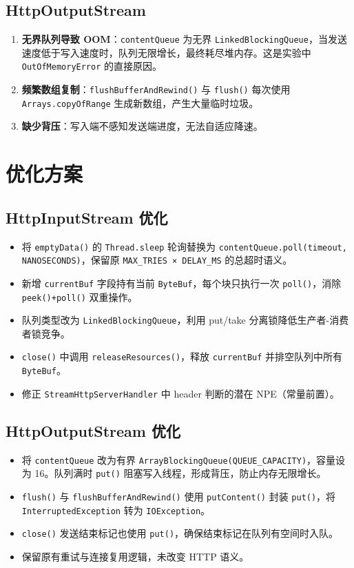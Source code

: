 \documentclass[11pt,a4paper]{article}
\begin{document}
\subsection{HttpOutputStream}
\begin{enumerate}
    \item \textbf{无界队列导致 OOM}：\texttt{contentQueue} 为无界 \texttt{LinkedBlockingQueue}，当发送速度低于写入速度时，队列无限增长，最终耗尽堆内存。这是实验中 \texttt{OutOfMemoryError} 的直接原因。
    \item \textbf{频繁数组复制}：\texttt{flushBufferAndRewind()} 与 \texttt{flush()} 每次使用 \texttt{Arrays.copyOfRange} 生成新数组，产生大量临时垃圾。
    \item \textbf{缺少背压}：写入端不感知发送端进度，无法自适应降速。
\end{enumerate}

\section{优化方案}

\subsection{HttpInputStream 优化}
\begin{itemize}
    \item 将 \texttt{emptyData()} 的 \texttt{Thread.sleep} 轮询替换为 \texttt{contentQueue.poll(timeout, NANOSECONDS)}，保留原 \texttt{MAX\_TRIES × DELAY\_MS} 的总超时语义。
    \item 新增 \texttt{currentBuf} 字段持有当前 \texttt{ByteBuf}，每个块只执行一次 \texttt{poll()}，消除 \texttt{peek()+poll()} 双重操作。
    \item 队列类型改为 \texttt{LinkedBlockingQueue}，利用 put/take 分离锁降低生产者-消费者锁竞争。
    \item \texttt{close()} 中调用 \texttt{releaseResources()}，释放 \texttt{currentBuf} 并排空队列中所有 \texttt{ByteBuf}。
    \item 修正 \texttt{StreamHttpServerHandler} 中 header 判断的潜在 NPE（常量前置）。
\end{itemize}

\subsection{HttpOutputStream 优化}
\begin{itemize}
    \item 将 \texttt{contentQueue} 改为有界 \texttt{ArrayBlockingQueue(QUEUE\_CAPACITY)}，容量设为 16。队列满时 \texttt{put()} 阻塞写入线程，形成背压，防止内存无限增长。
    \item \texttt{flush()} 与 \texttt{flushBufferAndRewind()} 使用 \texttt{putContent()} 封装 \texttt{put()}，将 \texttt{InterruptedException} 转为 \texttt{IOException}。
    \item \texttt{close()} 发送结束标记也使用 \texttt{put()}，确保结束标记在队列有空间时入队。
    \item 保留原有重试与连接复用逻辑，未改变 HTTP 语义。
\end{itemize}
\end{document}
